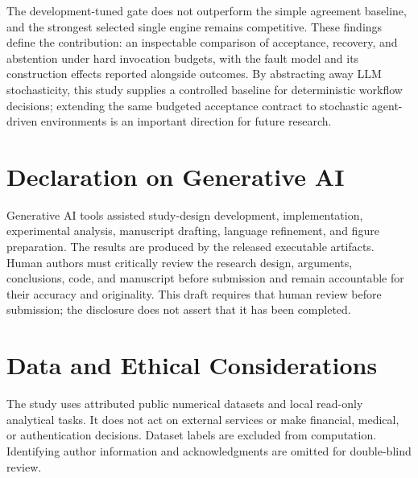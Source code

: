 \documentclass{svproc}
\begin{document}
The development-tuned gate does not outperform the simple agreement baseline, and the strongest selected single engine remains competitive. These findings define the contribution: an inspectable comparison of acceptance, recovery, and abstention under hard invocation budgets, with the fault model and its construction effects reported alongside outcomes. By abstracting away LLM stochasticity, this study supplies a controlled baseline for deterministic workflow decisions; extending the same budgeted acceptance contract to stochastic agent-driven environments is an important direction for future research.

\section*{Declaration on Generative AI}
Generative AI tools assisted study-design development, implementation, experimental analysis, manuscript drafting, language refinement, and figure preparation. The results are produced by the released executable artifacts. Human authors must critically review the research design, arguments, conclusions, code, and manuscript before submission and remain accountable for their accuracy and originality. This draft requires that human review before submission; the disclosure does not assert that it has been completed.

\section*{Data and Ethical Considerations}
The study uses attributed public numerical datasets and local read-only analytical tasks. It does not act on external services or make financial, medical, or authentication decisions. Dataset labels are excluded from computation. Identifying author information and acknowledgments are omitted for double-blind review.



\end{document}
